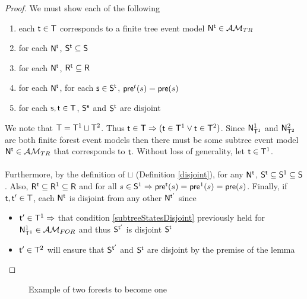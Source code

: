 \begin{proof}
We must show each of the following
\begin{enumerate}
	\item each $\evt \in \evT$ corresponds to a finite tree event model $\evM^\evt \in \treeClass$ \label{treeCorrespondence}
	\item for each $\evM^\evt$, $\evS^\evt \subseteq \evS$ \label{forestStateSubsets}
	\item for each $\evM^\evt$, $\evR^\evt \subseteq \evR$ \label{forestEdgeSubsets}
	\item for each $\evM^\evt$, for each $\evs \in \evS^\evt$, $\evpr^t(s) = \evpr(s)$ \label{preconMatch}
	\item for each $\evs, \evt \in \evT$, $\evS^\evs$ and $\evS^\evt$ are disjoint \label{subtreeStatesDisjoint}
\end{enumerate}

We note that $\evT = \evT^1 \sqcup \evT^2$.
Thus $\evt \in \evT \Rightarrow (\evt \in \evT^1 \lor \evt \in \evT^2)$.
Since $\evM^1_{\evT^1}$ and $\evM^2_{\evT^2}$ are both finite forest event models then there must be some
subtree event model $\evM^\evt \in \treeClass$ that corresponds to $\evt$.
Without loss of generality, let $\evt \in \evT^1$.\\
\\
Furthermore, by the definition of $\sqcup$ (Definition \ref{disjoint}), for any $\evM^\evt$, $\evS^\evt \subseteq \evS^1 \subseteq \evS$.
Also, $\evR^\evt \subseteq \evR^1 \subseteq \evR$ and for all $s \in \evS^1 \Rightarrow \evpr^\evt(s) = \evpr^1(s) =
\evpr(s)$.
Finally, if $\evt, \evt' \in \evT$, each $\evM^\evt$ is disjoint from any other $\evM^{\evt'}$ since
\begin{itemize}
	\item $\evt' \in \evT^1 \Rightarrow$ that condition \ref{subtreeStatesDisjoint} previously held for
	$\evM^1_{\evT^1} \in \forestClass$ and thus $\evS^{\evt'}$ is disjoint $\evS^\evt$
	\item $\evt' \in \evT^2$ will ensure that $\evS^{\evt'}$ and $\evS^\evt$ are disjoint by the premise of
	the lemma
\end{itemize}
\end{proof}

\begin{figure}
	\centering
	\FIXME
	\caption{Example of two forests to become one}
	\label{figure:example2Forest}
\end{figure}

